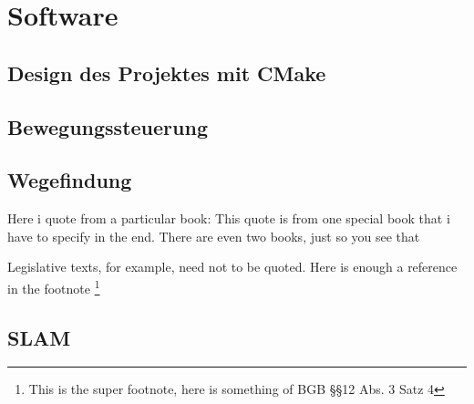 \chapter{Software}

\section{Design des Projektes mit CMake}

\section{Bewegungssteuerung}


\section{Wegefindung}

Here i quote from a particular book: This quote is from one special book that i have to specify in the end. There are even two books, just so you see that \cite{Williams201205,Siegert200612}


Legislative texts, for example, need not to be quoted. Here is enough a reference in the footnote \footnote{This is the super footnote, here is something of BGB §§12 Abs. 3 Satz 4}


\section{SLAM}